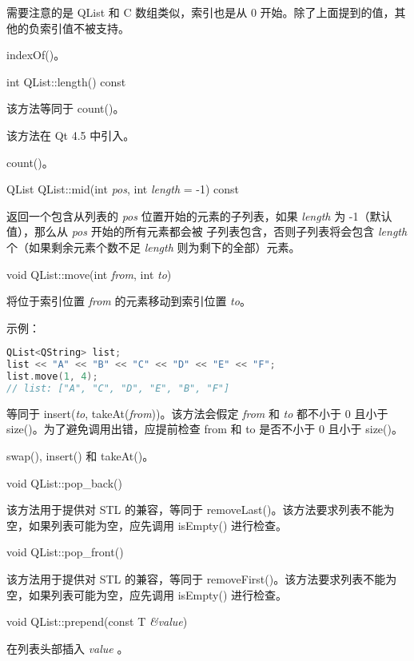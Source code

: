 需要注意的是 QList 和 C 数组类似，索引也是从 0 开始。除了上面提到的值，其他的负索引值不被支持。


\begin{seeAlso}
indexOf()。
\end{seeAlso}


int QList::length() const

该方法等同于 count()。

该方法在 Qt 4.5 中引入。


\begin{seeAlso}
count()。
\end{seeAlso}


QList QList::mid(int \emph{pos}, int \emph{length} = -1) const

返回一个包含从列表的 \emph{pos} 位置开始的元素的子列表，如果
\emph{length} 为 -1（默认值），那么从 \emph{pos} 开始的所有元素都会被
子列表包含，否则子列表将会包含 \emph{length} 个（如果剩余元素个数不足 \emph{length} 则为剩下的全部）元素。

void QList::move(int \emph{from}, int \emph{to})

将位于索引位置 \emph{from} 的元素移动到索引位置 \emph{to}。

示例：


\begin{lstlisting}[language=C++]
QList<QString> list;
list << "A" << "B" << "C" << "D" << "E" << "F";
list.move(1, 4);
// list: ["A", "C", "D", "E", "B", "F"]
\end{lstlisting}

等同于 insert(\emph{to}, takeAt(\emph{from}))。该方法会假定 \emph{from} 和 \emph{to} 都不小于 0 且小于 size()。为了避免调用出错，应提前检查 from 和 to 是否不小于 0 且小于 size()。

\begin{seeAlso}
swap(), insert() 和 takeAt()。
\end{seeAlso}

void QList::pop\_back()

该方法用于提供对 STL 的兼容，等同于 removeLast()。该方法要求列表不能为空，如果列表可能为空，应先调用 isEmpty() 进行检查。

void QList::pop\_front()

该方法用于提供对 STL 的兼容，等同于 removeFirst()。该方法要求列表不能为空，如果列表可能为空，应先调用 isEmpty() 进行检查。

void QList::prepend(const T \emph{\&value})

在列表头部插入 \emph{value} 。

